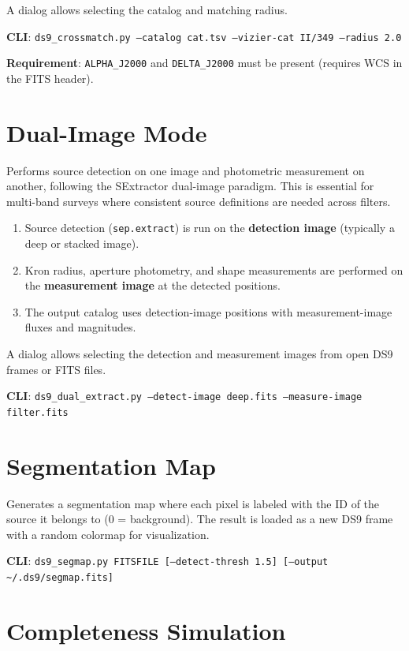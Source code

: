 \documentclass[11pt,fleqn]{book}
\begin{document}
A dialog allows selecting the catalog and matching radius.

\textbf{CLI}: \texttt{ds9\_crossmatch.py --catalog cat.tsv --vizier-cat II/349 --radius 2.0}

\textbf{Requirement}: \texttt{ALPHA\_J2000} and \texttt{DELTA\_J2000} must be present (requires WCS in the FITS header).


\section{Dual-Image Mode}

Performs source detection on one image and photometric measurement on another, following the SExtractor dual-image paradigm. This is essential for multi-band surveys where consistent source definitions are needed across filters.

\begin{enumerate}[leftmargin=2em]
  \item Source detection (\texttt{sep.extract}) is run on the \textbf{detection image} (typically a deep or stacked image).
  \item Kron radius, aperture photometry, and shape measurements are performed on the \textbf{measurement image} at the detected positions.
  \item The output catalog uses detection-image positions with measurement-image fluxes and magnitudes.
\end{enumerate}

A dialog allows selecting the detection and measurement images from open DS9 frames or FITS files.

\textbf{CLI}: \texttt{ds9\_dual\_extract.py --detect-image deep.fits --measure-image filter.fits}


\section{Segmentation Map}

Generates a segmentation map where each pixel is labeled with the ID of the source it belongs to (0 = background). The result is loaded as a new DS9 frame with a random colormap for visualization.

\textbf{CLI}: \texttt{ds9\_segmap.py FITSFILE [--detect-thresh 1.5] [--output \textasciitilde/.ds9/segmap.fits]}


\section{Completeness Simulation}
\end{document}
